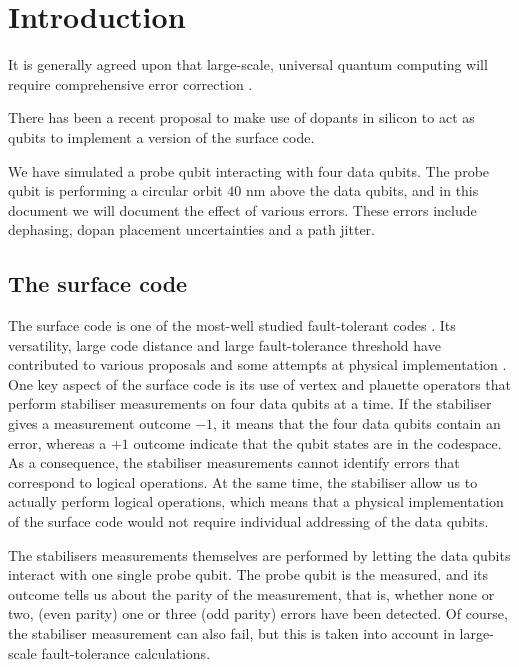 
\section{Introduction} \label{sec:Introduction}

It is generally agreed upon that large-scale, universal quantum computing will require comprehensive error correction \cite{Wang2011,Fowler2012}.





There has been a recent proposal to make use of dopants in silicon to act as qubits \cite{the paper} to implement a version of the surface code. 


We have simulated a probe qubit interacting with four data qubits. The probe qubit is performing a circular orbit $40$ nm above the data qubits, and in this document we will document the effect of various errors. These errors include dephasing, dopan placement uncertainties and a path jitter. 



\subsection{The surface code}
The surface code is one of the most-well studied fault-tolerant codes \cite{something}. Its versatility, large code distance and large fault-tolerance threshold have contributed to various proposals \cite{some review} and some attempts at physical implementation \cite{Martinis?}. One key aspect of the surface code is its use of vertex and plauette operators that perform stabiliser measurements on four data qubits at a time. If the stabiliser gives a measurement outcome $-1$, it means that the four data qubits contain an error, whereas a $+1$ outcome indicate that the qubit states are in the codespace. As a consequence, the stabiliser measurements cannot identify errors that correspond to logical operations. At the same time, the stabiliser allow us to actually perform logical operations, which means that a physical implementation of the surface code would not require individual addressing of the data qubits. 

The stabilisers measurements themselves are performed by letting the data qubits interact with one single probe qubit. The probe qubit is the measured, and its outcome tells us about the parity of the measurement, that is, whether none or two,  (even parity) one  or three (odd parity) errors have been detected. Of course, the stabiliser measurement can also fail, but this is taken into account in large-scale fault-tolerance calculations. 




